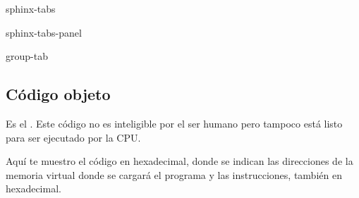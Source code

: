 \documentclass[letterpaper,10pt,spanish]{sphinxmanual}
\begin{document}
\begin{sphinxuseclass}{sphinx-tabs}
\begin{sphinxuseclass}{sphinx-tabs-panel}
\begin{sphinxuseclass}{group-tab}
\begin{sphinxVerbatim}[commandchars=\\\{\}]
         
         
         
         
         
         
        
         
      
        
      
            
\end{sphinxVerbatim}

\end{sphinxuseclass}
\end{sphinxuseclass}
\end{sphinxuseclass}

\subsection{Código objeto}
\label{\detokenize{obtencion_del_codigo:codigo-objeto}}
\sphinxAtStartPar
Es el . Este código no es inteligible por el ser humano pero tampoco está listo para ser ejecutado por la CPU.

\sphinxAtStartPar
Aquí te muestro el código  en hexadecimal, donde se indican las direcciones de la memoria virtual donde se cargará el programa y las instrucciones, también en hexadecimal.
\end{document}
